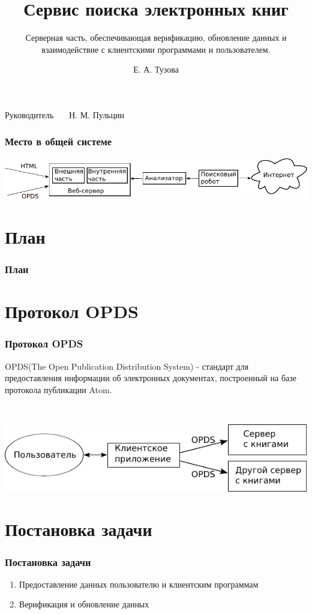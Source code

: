 \documentclass[utf8,handout]{beamer}
\title{Сервис поиска электронных книг }
\subtitle{Серверная часть, обеспечивающая верификацию, обновление данных и взаимодействие с клиентскими программами и пользователем.}
\author{Е. А. Тузова}
\institute{Академический Университет РАН}
\date{}
\begin{document}
\begin{frame}
  \titlepage

  \begin{flushright}
  
    Руководитель~~~  Н. М. Пульцин

  \end{flushright}
\end{frame}


\begin{frame}
	\frametitle{Место в общей системе}
	\includegraphics[width=1.05\textwidth]{./head/innerstructure-new}
\end{frame}

\section*{План}
  \begin{frame}
    \frametitle{План}
    \tableofcontents[pausesections]

  \end{frame}

\section{Протокол OPDS}
  \begin{frame}
    \frametitle{Протокол OPDS}
    \begin{block}{}
	OPDS(The Open Publication Distribution System) - стандарт для предоставления информации об электронных документах, построенный на базе протокола публикации Atom.
	\end{block}
	\ 
    
	\includegraphics{./head/scheme}
  \end{frame}

\section{Постановка задачи}
  \begin{frame}

    \frametitle{Постановка задачи}
    \begin{enumerate}
      \item Предоставление данных пользователю и клиентским программам
      \item Верификация и обновление данных
    \end{enumerate}
  \end{frame}
\end{document}
